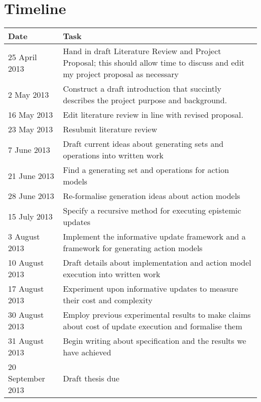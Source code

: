 \documentclass[12pt, a4paper]{article}
\begin{document}
\section*{Timeline}

\begin{center}
	\begin{tabular}{ | l | p{10cm} |}
		\hline
		Date & Task \\
		\hline
		25 April 2013 & Hand in draft Literature Review and Project Proposal;
    this should allow time to discuss and edit my project proposal as necessary\\
		\hline
		2 May 2013 & Construct a draft introduction that succintly describes the project purpose and background.\\
		\hline
		16 May 2013 & Edit literature review in line with revised proposal.\\
		\hline
		23 May 2013 & Resubmit literature review \\
		\hline
		7 June 2013 & Draft current ideas about generating sets and operations into
		written work\\
		\hline
		21 June 2013 & Find a generating set and operations for action models \\
		\hline
		28 June 2013 & Re-formalise generation ideas about action models\\
		\hline
		15 July 2013 & Specify a recursive method for executing epistemic updates\\
		\hline
		3 August 2013 & Implement the informative update framework and a framework
		for generating action models\\
		\hline
		10 August 2013 & Draft details about implementation and action model
		execution into written work\\
		\hline
		17 August 2013 & Experiment upon informative updates to measure their cost
		and complexity \\
		\hline
		30 August 2013 & Employ previous experimental results to make claims about
		cost of update execution and formalise them \\
		\hline
		31 August 2013 & Begin writing about specification and the results we have achieved \\
		\hline
		20 September 2013 & Draft thesis due \\
		\hline
	\end{tabular}
\end{center}





\end{document}
